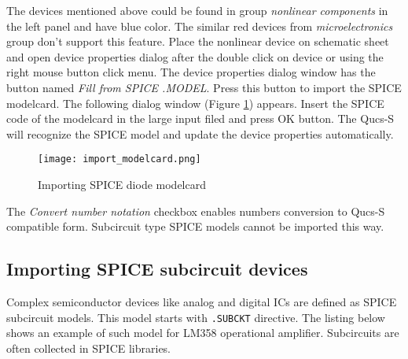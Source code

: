 The devices mentioned above could be found in group \emph{nonlinear components} in the left panel and have blue color. The similar red devices from \emph{microelectronics} group don't support this feature. Place the nonlinear device on schematic sheet and open device properties dialog after the double click on device or using the right mouse button click menu. The device properties dialog window has the button named \emph{Fill from SPICE .MODEL}. Press this button to import the SPICE modelcard. The following dialog window (Figure \ref{fig:spice_import}) appears. Insert the SPICE code of the modelcard in the large input filed and press OK button. The Qucs-S will recognize the SPICE model and update the device properties automatically.



    \begin{figure}[!ht]
    \begin{center}
        \texttt{[image: import\_modelcard.png]}
    \end{center}
    \caption{Importing SPICE diode modelcard} \label{fig:spice_import}
    \end{figure}

The \emph{Convert number notation} checkbox enables numbers conversion to Qucs-S compatible form. Subcircuit type SPICE models cannot be imported this way.

\subsection{Importing SPICE subcircuit devices}

Complex semiconductor devices like analog and digital ICs are defined as SPICE subcircuit models. This model starts with \verb|.SUBCKT| directive. The listing below shows an example of such model for LM358 operational amplifier. Subcircuits are often collected in SPICE libraries.

